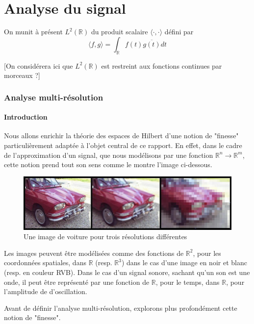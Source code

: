 \documentclass[]{article}
\theoremstyle{remark}
\theoremstyle{definition}
\begin{document}
	\part{Analyse du signal}
	
	On munit à présent $L^2(\mathbb{R})$ du produit scalaire $\langle \cdot, \cdot \rangle$ défini par $$\langle f, g\rangle = \int_\mathbb{R} f(t) \overline{g(t)} dt$$
	
	[On considérera ici que $L^2(\mathbb{R})$ est restreint aux fonctions continues par morceaux ?]
	
	\section{Analyse multi-résolution}
	
	\subsection{Introduction}
	
	Nous allons enrichir la théorie des espaces de Hilbert d'une notion de "finesse"  particulièrement adaptée à l'objet central de ce rapport. En effet, dans le cadre de l'approximation d'un signal, que nous modélisons par une fonction $\mathbb{R}^n \rightarrow \mathbb{R}^m$, cette notion prend tout son sens comme le montre l'image ci-dessous.
	
	\begin{figure}[h]
		\centering
		\includegraphics[width=350pt]{Resolution_wikipedia.jpg}
		\caption{Une image de voiture pour trois résolutions différentes}
	\end{figure}
	
	Les images peuvent être modélisées comme des fonctions de $\mathbb{R}^2$, pour les coordonnées spatiales, dans $\mathbb{R}$ (resp. $\mathbb{R}^3$) dans le cas d'une image en noir et blanc (resp. en couleur RVB). Dans le cas d'un signal sonore, sachant qu'un son est une onde, il peut être représenté par une fonction de $\mathbb{R}$, pour le temps, dans $\mathbb{R}$, pour l'amplitude de d'oscillation.
	
	Avant de définir l'analyse multi-résolution, explorons plus profondément cette notion de "finesse".
	
\end{document}
